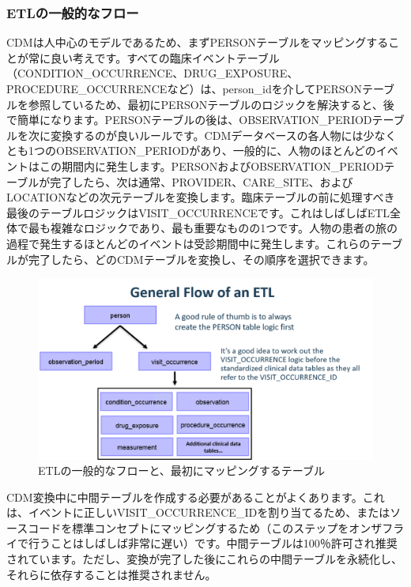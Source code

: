 \documentclass[
  11pt]{book}
\theoremstyle{definition}
\theoremstyle{definition}
\theoremstyle{definition}
\theoremstyle{definition}
\theoremstyle{remark}
\begin{document}
\subsubsection*{ETLの一般的なフロー}\label{etlux306eux4e00ux822cux7684ux306aux30d5ux30edux30fc}

CDMは人中心のモデルであるため、まずPERSONテーブルをマッピングすることが常に良い考えです。すべての臨床イベントテーブル（CONDITION\_OCCURRENCE、DRUG\_EXPOSURE、PROCEDURE\_OCCURRENCEなど）は、person\_idを介してPERSONテーブルを参照しているため、最初にPERSONテーブルのロジックを解決すると、後で簡単になります。PERSONテーブルの後は、OBSERVATION\_PERIODテーブルを次に変換するのが良いルールです。CDMデータベースの各人物には少なくとも1つのOBSERVATION\_PERIODがあり、一般的に、人物のほとんどのイベントはこの期間内に発生します。PERSONおよびOBSERVATION\_PERIODテーブルが完了したら、次は通常、PROVIDER、CARE\_SITE、およびLOCATIONなどの次元テーブルを変換します。臨床テーブルの前に処理すべき最後のテーブルロジックはVISIT\_OCCURRENCEです。これはしばしばETL全体で最も複雑なロジックであり、最も重要なものの1つです。人物の患者の旅の過程で発生するほとんどのイベントは受診期間中に発生します。これらのテーブルが完了したら、どのCDMテーブルを変換し、その順序を選択できます。

\begin{figure}

{\centering \includegraphics[width=1\linewidth]{images/ExtractTransformLoad/flowOfEtl} 

}

\caption{ETLの一般的なフローと、最初にマッピングするテーブル}\label{fig:etlFlow}
\end{figure}

CDM変換中に中間テーブルを作成する必要があることがよくあります。これは、イベントに正しいVISIT\_OCCURRENCE\_IDを割り当てるため、またはソースコードを標準コンセプトにマッピングするため（このステップをオンザフライで行うことはしばしば非常に遅い）です。中間テーブルは100％許可され推奨されています。ただし、変換が完了した後にこれらの中間テーブルを永続化し、それらに依存することは推奨されません。
\end{document}

